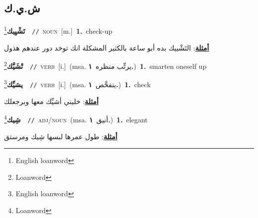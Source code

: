\documentclass[10pt,a4paper,twoside]{article} %
\begin{document}
\begin{multicols}{2}
\vspace{-3mm}
\subsection*{\color{blue}\foreignlanguage{arabic}{ش.ي.ك}\color{blue}{ (ntws)}} 

{\setlength\topsep{0pt}\textbf{\foreignlanguage{arabic}{تَشْيِيك}}\footnote{English loanword}\ \ {\color{gray}\texttt{//}\color{black}}\ \textsc{noun}\ [m.]\ \textbf{1.}~check-up\  \begin{flushright}\color{gray}\foreignlanguage{arabic}{\textbf{\underline{\foreignlanguage{arabic}{أمثلة}}}: التَشْييك بده أبو ساعة بالكثير المشكلة انك توخد دور عندهم هذول}\end{flushright}\color{black}} \vspace{2mm}

{\setlength\topsep{0pt}\textbf{\foreignlanguage{arabic}{تْشَيَّك}}\footnote{Loanword}\ \ {\color{gray}\texttt{//}\color{black}}\ \textsc{verb}\ [i.]\ \color{gray}(msa. \foreignlanguage{arabic}{يرتِّب منظره}~\foreignlanguage{arabic}{\textbf{١.}})\color{black}\ \textbf{1.}~smarten oneself up\ } \vspace{2mm}

{\setlength\topsep{0pt}\textbf{\foreignlanguage{arabic}{يشيِّك}}\footnote{English loanword}\ \ {\color{gray}\texttt{//}\color{black}}\ \textsc{verb}\ [i.]\ \color{gray}(msa. \foreignlanguage{arabic}{يتفحَّص}~\foreignlanguage{arabic}{\textbf{١.}})\color{black}\ \textbf{1.}~check\  \begin{flushright}\color{gray}\foreignlanguage{arabic}{\textbf{\underline{\foreignlanguage{arabic}{أمثلة}}}: خليني أشيِّك معها وبرجعلك}\end{flushright}\color{black}} \vspace{2mm}

{\setlength\topsep{0pt}\textbf{\foreignlanguage{arabic}{شِيك}}\footnote{Loanword}\ \ {\color{gray}\texttt{//}\color{black}}\ \textsc{adj/noun}\ \color{gray}(msa. \foreignlanguage{arabic}{أنيق}~\foreignlanguage{arabic}{\textbf{١.}})\color{black}\ \textbf{1.}~elegant\  \begin{flushright}\color{gray}\foreignlanguage{arabic}{\textbf{\underline{\foreignlanguage{arabic}{أمثلة}}}: طول عمرها لبسها شِيك ومرستق}\end{flushright}\color{black}} \vspace{2mm}


\end{multicols}
\end{document}
